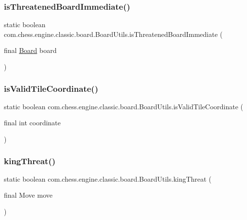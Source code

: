 \subsubsection{\texorpdfstring{isThreatenedBoardImmediate()}{isThreatenedBoardImmediate()}}
{\footnotesize\ttfamily static boolean com.\+chess.\+engine.\+classic.\+board.\+Board\+Utils.\+is\+Threatened\+Board\+Immediate (\begin{DoxyParamCaption}\item[{final \mbox{\hyperlink{classcom_1_1chess_1_1engine_1_1classic_1_1board_1_1_board}{Board}}}]{board }\end{DoxyParamCaption})\hspace{0.3cm}{\ttfamily [static]}}

\mbox{\label{enumcom_1_1chess_1_1engine_1_1classic_1_1board_1_1_board_utils_ab808c5f614eba8ab2dfbfc114ae0f01a}} 
\subsubsection{\texorpdfstring{isValidTileCoordinate()}{isValidTileCoordinate()}}
{\footnotesize\ttfamily static boolean com.\+chess.\+engine.\+classic.\+board.\+Board\+Utils.\+is\+Valid\+Tile\+Coordinate (\begin{DoxyParamCaption}\item[{final int}]{coordinate }\end{DoxyParamCaption})\hspace{0.3cm}{\ttfamily [static]}}

\mbox{\label{enumcom_1_1chess_1_1engine_1_1classic_1_1board_1_1_board_utils_a0f8cd610254cc5baf8bb61e7d4db12a2}} 
\subsubsection{\texorpdfstring{kingThreat()}{kingThreat()}}
{\footnotesize\ttfamily static boolean com.\+chess.\+engine.\+classic.\+board.\+Board\+Utils.\+king\+Threat (\begin{DoxyParamCaption}\item[{final Move}]{move }\end{DoxyParamCaption})\hspace{0.3cm}{\ttfamily [static]}}

